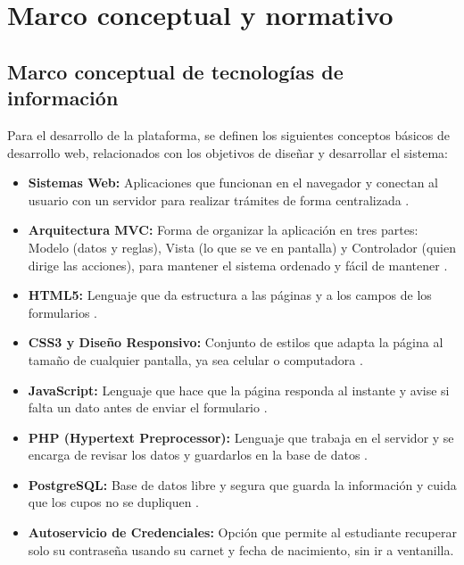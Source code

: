 \section{Marco conceptual y normativo}
\label{sec:marco_conceptual}

\subsection{Marco conceptual de tecnologías de información}

Para el desarrollo de la plataforma, se definen los siguientes conceptos básicos de desarrollo web, relacionados con los objetivos de diseñar y desarrollar el sistema:

\begin{itemize}
    \item \textbf{Sistemas Web:} Aplicaciones que funcionan en el navegador y conectan al usuario con un servidor para realizar trámites de forma centralizada \parencite{pressman2020}.
    \item \textbf{Arquitectura MVC:} Forma de organizar la aplicación en tres partes: Modelo (datos y reglas), Vista (lo que se ve en pantalla) y Controlador (quien dirige las acciones), para mantener el sistema ordenado y fácil de mantener \parencite{pressman2020}.
    \item \textbf{HTML5:} Lenguaje que da estructura a las páginas y a los campos de los formularios \parencite{mdn2025}.
    \item \textbf{CSS3 y Diseño Responsivo:} Conjunto de estilos que adapta la página al tamaño de cualquier pantalla, ya sea celular o computadora \parencite{marcotte2018,w3schools2025}.
    \item \textbf{JavaScript:} Lenguaje que hace que la página responda al instante y avise si falta un dato antes de enviar el formulario \parencite{mozilla2025}.
    \item \textbf{PHP (Hypertext Preprocessor):} Lenguaje que trabaja en el servidor y se encarga de revisar los datos y guardarlos en la base de datos \parencite{arimetrics2024}.
    \item \textbf{PostgreSQL:} Base de datos libre y segura que guarda la información y cuida que los cupos no se dupliquen \parencite{postgresql2025}.
    \item \textbf{Autoservicio de Credenciales:} Opción que permite al estudiante recuperar solo su contraseña usando su carnet y fecha de nacimiento, sin ir a ventanilla.
\end{itemize}

